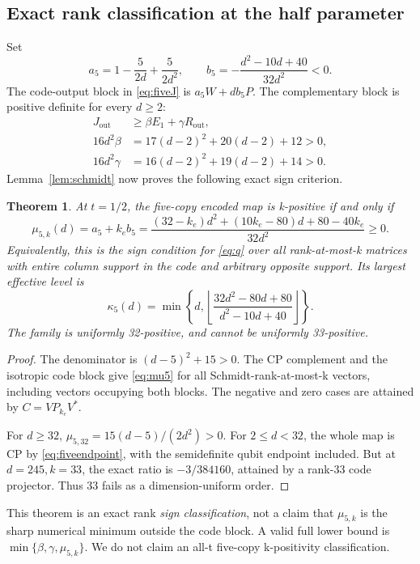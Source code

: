 \documentclass[11pt,a4paper]{article}
\newtheorem{theorem}{Theorem}
\begin{document}
\subsection{Exact rank classification at the half parameter}
Set
\[
 a_5=1-\frac5{2d}+\frac5{2d^2},\qquad
 b_5=-\frac{d^2-10d+40}{32d^2}<0.
\]
The code-output block in \eqref{eq:fiveJ} is \(a_5W+db_5P\). The complementary block is positive definite for every \(d\ge2\):
\begin{align*}
 J_{\mathrm{out}}&\ge\beta E_1+\gamma R_{\mathrm{out}},\\
 16d^2\beta&=17(d-2)^2+20(d-2)+12>0,\\
 16d^2\gamma&=16(d-2)^2+19(d-2)+14>0.
\end{align*}
Lemma~\ref{lem:schmidt} now proves the following exact sign criterion.

\begin{theorem}\label{thm:rank5}
At \(t=1/2\), the five-copy encoded map is k-positive if and only if
\begin{equation}\label{eq:mu5}
 \mu_{5,k}(d)=a_5+k_eb_5
 =\frac{(32-k_e)d^2+(10k_e-80)d+80-40k_e}{32d^2}\ge0.
\end{equation}
Equivalently, this is the sign condition for \eqref{eq:q} over all rank-at-most-k matrices with entire column support in the code and arbitrary opposite support. Its largest effective level is
\[
 \kappa_5(d)=\min\left\{d,
 \left\lfloor\frac{32d^2-80d+80}{d^2-10d+40}\right\rfloor\right\}.
\]
The family is uniformly 32-positive, and cannot be uniformly 33-positive.
\end{theorem}
\begin{proof}
The denominator is \((d-5)^2+15>0\). The CP complement and the isotropic code block give \eqref{eq:mu5} for all Schmidt-rank-at-most-k vectors, including vectors occupying both blocks. The negative and zero cases are attained by \(C=VP_{k_e}V^*\).

For \(d\ge32\), \(\mu_{5,32}=15(d-5)/(2d^2)>0\). For \(2\le d<32\), the whole map is CP by \eqref{eq:fiveendpoint}, with the semidefinite qubit endpoint included. But at \(d=245,k=33\), the exact ratio is \(-3/384160\), attained by a rank-33 code projector. Thus 33 fails as a dimension-uniform order.
\end{proof}

This theorem is an exact rank \emph{sign classification}, not a claim that \(\mu_{5,k}\) is the sharp numerical minimum outside the code block. A valid full lower bound is \(\min\{\beta,\gamma,\mu_{5,k}\}\). We do not claim an all-t five-copy k-positivity classification.
\end{document}
